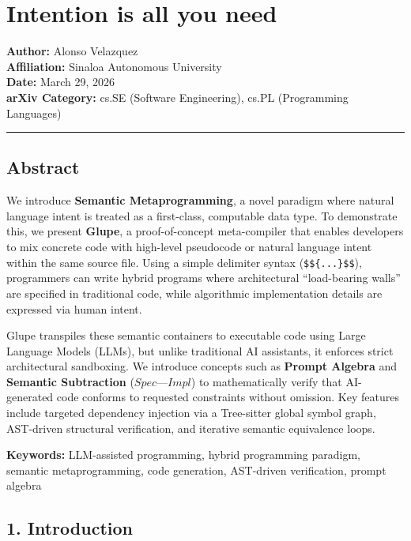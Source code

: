 \documentclass[11pt, a4paper]{article}
\begin{document}
\section{Intention is all you need}\label{intention-is-all-you-need}

\textbf{Author:} Alonso Velazquez\\
\textbf{Affiliation:} Sinaloa Autonomous University\\
\textbf{Date:} March 29, 2026\\
\textbf{arXiv Category:} cs.SE (Software Engineering), cs.PL
(Programming Languages)

\begin{center}\rule{0.5\linewidth}{0.5pt}\end{center}

\subsection{Abstract}\label{abstract}

We introduce \textbf{Semantic Metaprogramming}, a novel paradigm where
natural language intent is treated as a first-class, computable data
type. To demonstrate this, we present \textbf{Glupe}, a proof-of-concept
meta-compiler that enables developers to mix concrete code with
high-level pseudocode or natural language intent within the same source
file. Using a simple delimiter syntax (\texttt{\$\$\{...\}\$\$}),
programmers can write hybrid programs where architectural ``load-bearing
walls'' are specified in traditional code, while algorithmic
implementation details are expressed via human intent.

Glupe transpiles these semantic containers to executable code using
Large Language Models (LLMs), but unlike traditional AI assistants, it
enforces strict architectural sandboxing. We introduce concepts such as
\textbf{Prompt Algebra} and \textbf{Semantic Subtraction}
(\(Spec — Impl\)) to mathematically verify that AI-generated code
conforms to requested constraints without omission. Key features include
targeted dependency injection via a Tree-sitter global symbol graph,
AST-driven structural verification, and iterative semantic equivalence
loops.

\textbf{Keywords:} LLM-assisted programming, hybrid programming
paradigm, semantic metaprogramming, code generation, AST-driven
verification, prompt algebra

\subsection{1. Introduction}\label{introduction}
\end{document}
